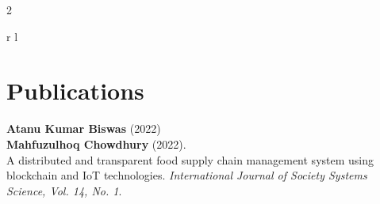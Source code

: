 \documentclass[
	10pt, %
]{RESUME}
\begin{document}
\begin{paracol}{2}

	\begin{supertabular}{r l} %




		 {}


		 {}

	\end{supertabular}


	\section{Publications}


	\textbf{Atanu Kumar Biswas} (2022) \\
	\medskip %
	\textbf{Mahfuzulhoq Chowdhury} (2022).\\
	A distributed and transparent food supply chain management system using blockchain and IoT technologies. \textit{International Journal of Society Systems Science, Vol. 14, No. 1}.

	\medskip %




\end{paracol}
\end{document}
